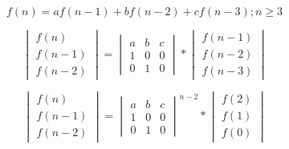 $$ f(n) = af(n - 1) + bf(n - 2) + c f(n - 3); n \geq 3 $$

$$\begin{vmatrix}
f(n) \\ 
f(n - 1) \\ 
f(n - 2)
\end{vmatrix}
=
\begin{vmatrix}
a & b & c \\
1 & 0 & 0 \\ 
0 & 1 & 0
\end{vmatrix}
*
\begin{vmatrix}
f(n - 1)\\ 
f(n - 2)\\ 
f(n - 3)
\end{vmatrix}$$

$$\begin{vmatrix}
f(n) \\ 
f(n - 1) \\ 
f(n - 2)
\end{vmatrix}
=
\begin{vmatrix}
a & b & c \\
1 & 0 & 0 \\ 
0 & 1 & 0
\end{vmatrix} ^ {n - 2}
*
\begin{vmatrix}
f(2)\\ 
f(1)\\ 
f(0)
\end{vmatrix}$$